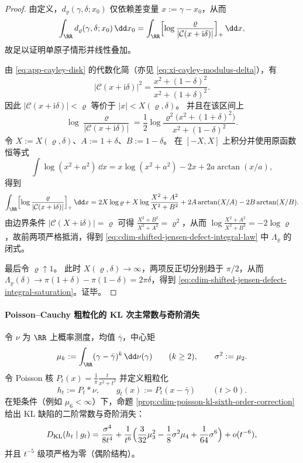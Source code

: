 \begin{proof}
由定义，\(d_{\varrho}(\gamma,\delta;x_0)\) 仅依赖差变量 \(x:=\gamma-x_0\)，从而
\[
\int_{\RR}d_{\varrho}(\gamma,\delta;x_0)\,\dd x_0
=\int_{\RR}\Bigl[\log\frac{\varrho}{|\mathcal{C}(x+\mathrm{i}\delta)|}\Bigr]_+\,\dd x,
\]
故足以证明单原子情形并线性叠加。
\par
由 \eqref{eq:app-cayley-disk} 的代数化简（亦见 \eqref{eq:xi-cayley-modulus-delta}），有
\[
|\mathcal{C}(x+\mathrm{i}\delta)|^2=\frac{x^2+(1-\delta)^2}{x^2+(1+\delta)^2}.
\]
因此 \(|\mathcal{C}(x+\mathrm{i}\delta)|<\varrho\) 等价于 \(|x|<X(\varrho,\delta)\)。
并且在该区间上
\[
\log\frac{\varrho}{|\mathcal{C}(x+\mathrm{i}\delta)|}
=\frac12\log\frac{\varrho^{2}\bigl(x^{2}+(1+\delta)^{2}\bigr)}{x^{2}+(1-\delta)^{2}}.
\]
令 \(X:=X(\varrho,\delta)\)、\(A:=1+\delta\)、\(B:=1-\delta\)。
在 \([-X,X]\) 上积分并使用原函数恒等式
\[
\int \log(x^2+a^2)\,\dd x=x\log(x^2+a^2)-2x+2a\arctan(x/a),
\]
得到
\[
\int_{\RR}\Bigl[\log\frac{\varrho}{|\mathcal{C}(x+\mathrm{i}\delta)|}\Bigr]_+\,\dd x
=2X\log\varrho+X\log\frac{X^2+A^2}{X^2+B^2}
+2A\arctan(X/A)-2B\arctan(X/B).
\]
由边界条件 \(|\mathcal{C}(X+\mathrm{i}\delta)|=\varrho\) 可得 \(\frac{X^{2}+B^{2}}{X^{2}+A^{2}}=\varrho^{2}\)，从而
\(
\log\frac{X^2+A^2}{X^2+B^2}=-2\log\varrho
\)，故前两项严格抵消，得到 \eqref{eq:cdim-shifted-jensen-defect-integral-law} 中 \(\Lambda_{\varrho}\) 的闭式。
\par
最后令 \(\varrho\uparrow 1\)。
此时 \(X(\varrho,\delta)\to\infty\)，两项反正切分别趋于 \(\pi/2\)，从而
\(
\Lambda_{\varrho}(\delta)\to \pi(1+\delta)-\pi(1-\delta)=2\pi\delta
\)，得到 \eqref{eq:cdim-shifted-jensen-defect-integral-saturation}。证毕。
\end{proof}

\paragraph{Poisson--Cauchy 粗粒化的 KL 次主常数与奇阶消失}
令 \(\nu\) 为 \(\RR\) 上概率测度，均值 \(\bar\gamma\)，中心矩
\[
\mu_k:=\int_{\RR}(\gamma-\bar\gamma)^k\,\dd\nu(\gamma)\qquad(k\ge 2),
\qquad
\sigma^2:=\mu_2.
\]
令 Poisson 核 \(P_t(x)=\frac{1}{\pi}\frac{t}{x^2+t^2}\) 并定义粗粒化
\[
h_t:=P_t*\nu,
\qquad
g_t(x):=P_t(x-\bar\gamma)
\qquad(t>0).
\]
在矩条件（例如 \(\mu_6<\infty\)）下，命题 \ref{prop:cdim-poisson-kl-sixth-order-correction} 给出 KL 缺陷的二阶常数与奇阶消失：
\[
D_{\mathrm{KL}}(h_t\mid g_t)
=\frac{\sigma^4}{8t^4}
+\frac{1}{t^6}\Bigl(\frac{3}{32}\mu_3^2-\frac18\sigma^2\mu_4+\frac{1}{64}\sigma^6\Bigr)+o(t^{-6}),
\]
并且 \(t^{-5}\) 级项严格为零（偶阶结构）。

